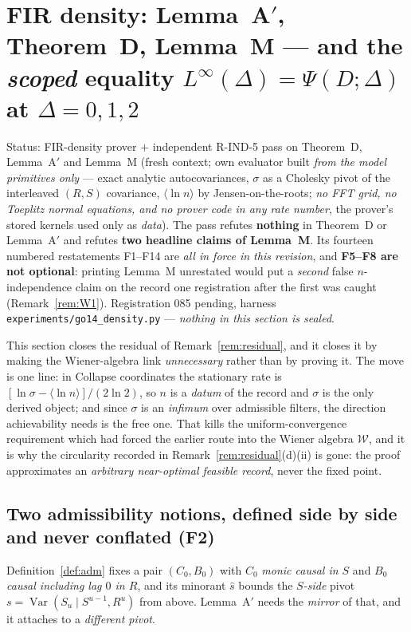 \documentclass[11pt]{article}
\theoremstyle{definition}
\theoremstyle{remark}
\begin{document}
\section{FIR density: Lemma~A$'$, Theorem~D, Lemma~M --- and the
\emph{scoped} equality $L^\infty(\Delta)=\Psi(D;\Delta)$ at $\Delta=0,1,2$}
\label{sec:firdens}
Status: FIR-density prover $+$ independent R-IND-5 pass on Theorem~D,
Lemma~A$'$ and Lemma~M (fresh context; own evaluator built \emph{from the
model primitives only} --- exact analytic autocovariances, $\sigma$ as a
Cholesky pivot of the interleaved $(R,S)$ covariance, $\langle\ln
n\rangle$ by Jensen-on-the-roots; \emph{no FFT grid, no Toeplitz normal
equations, and no prover code in any rate number}, the prover's stored
kernels used only as \emph{data}). The pass refutes \textbf{nothing} in
Theorem~D or Lemma~A$'$ and refutes \textbf{two headline claims of
Lemma~M}. Its fourteen numbered restatements F1--F14 are \emph{all in force
in this revision}, and \textbf{F5--F8 are not optional}: printing Lemma~M
unrestated would put a \emph{second} false $n$-independence claim on the
record one registration after the first was caught (Remark~\ref{rem:W1}).
Registration 085 pending, harness
\texttt{experiments/\allowbreak go14\_density.py} --- \emph{nothing in this
section is sealed}.

This section closes the residual of Remark~\ref{rem:residual}, and it closes
it by making the Wiener-algebra link \emph{unnecessary} rather than by
proving it. The move is one line: in Collapse coordinates the stationary rate
is $[\ln\sigma-\langle\ln n\rangle]/(2\ln2)$, so $n$ is a \emph{datum} of the
record and $\sigma$ is the only derived object; and since $\sigma$ is an
\emph{infimum} over admissible filters, the direction achievability needs is
the free one. That kills the uniform-convergence requirement which had forced
the earlier route into the Wiener algebra $\mathcal W$, and it is why the
circularity recorded in Remark~\ref{rem:residual}(d)(ii) is gone: the proof
approximates an \emph{arbitrary near-optimal feasible record}, never the fixed
point.

\subsection{Two admissibility notions, defined side by side and never
conflated (F2)}
\label{sec:twoadm}
Definition~\ref{def:adm} fixes a pair $(C_0,B_0)$ with $C_0$ \emph{monic
causal in $S$} and $B_0$ \emph{causal including lag $0$ in $R$}, and its
minorant $\hat s$ bounds the \emph{$S$-side} pivot
$s=\operatorname{Var}(S_u\mid S^{u-1},R^{u})$ from above. Lemma~A$'$ needs the
\emph{mirror} of that, and it attaches to a \emph{different pivot}.
\end{document}

